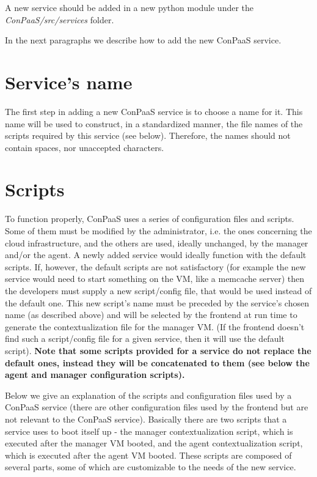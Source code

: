 \documentclass[10pt]{article}
\begin{document}
A new service should be added in a new python module under the \textit{ConPaaS/src/services} folder. \\


In the next paragraphs we describe how to add the new ConPaaS service.

\section{Service's name}

The first step in adding a new ConPaaS service is to choose a name for it. This name will be used to construct, in a standardized manner, the file names of the scripts required by this service (see below). Therefore, the names should not contain spaces, nor unaccepted characters. 

\section{Scripts}
To function properly, ConPaaS uses a series of configuration files and scripts. Some of them must be modified by the administrator, i.e. the ones concerning the cloud infrastructure, and the others are used, ideally unchanged, by the manager and/or the agent. A newly added service would ideally function with the default scripts. If, however, the default scripts are not satisfactory (for example the new service would need to start something on the VM, like a memcache server) then the developers must supply a new script/config file, that would be used instead of the default one. This new script's name must be preceded by the service's chosen name (as described above) and will be selected by the frontend at run time to generate the contextualization file for the manager VM. (If the frontend doesn't find such a script/config file for a given service, then it will use the default script). \textbf{Note that some scripts provided for a service do not replace the default ones, instead they will be concatenated to them (see below the agent and manager configuration scripts).}

Below we give an explanation of the scripts and configuration files used by a ConPaaS service (there are other configuration files used by the frontend but are not relevant to the ConPaaS service). Basically there are two scripts that a service uses to boot itself up - the manager contextualization script, which is executed after the manager VM booted, and the agent contextualization script, which is executed after the agent VM booted. These scripts are composed of several parts, some of which are customizable to the needs of the new service.      
\end{document}
